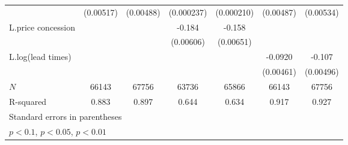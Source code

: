 {\begin{tabular}{l*{6}{c}}
            &   (0.00517)         &   (0.00488)         &  (0.000237)         &  (0.000210)         &   (0.00487)         &   (0.00534)         \\
\addlinespace
L.price concession&                     &                     &      -0.184\sym{***}&      -0.158\sym{***}&                     &                     \\
            &                     &                     &   (0.00606)         &   (0.00651)         &                     &                     \\
\addlinespace
L.log(lead times)   &                     &                     &                     &                     &     -0.0920\sym{***}&      -0.107\sym{***}\\
            &                     &                     &                     &                     &   (0.00461)         &   (0.00496)         \\
\midrule
\(N\)       &       66143         &       67756         &       63736         &       65866         &       66143         &       67756         \\
R-squared   &       0.883         &       0.897         &       0.644         &       0.634         &       0.917         &       0.927         \\
\bottomrule
\multicolumn{7}{l}{\footnotesize Standard errors in parentheses}\\
\multicolumn{7}{l}{\footnotesize \sym{*} \(p<0.1\), \sym{**} \(p<0.05\), \sym{***} \(p<0.01\)}\\
\end{tabular}
}
